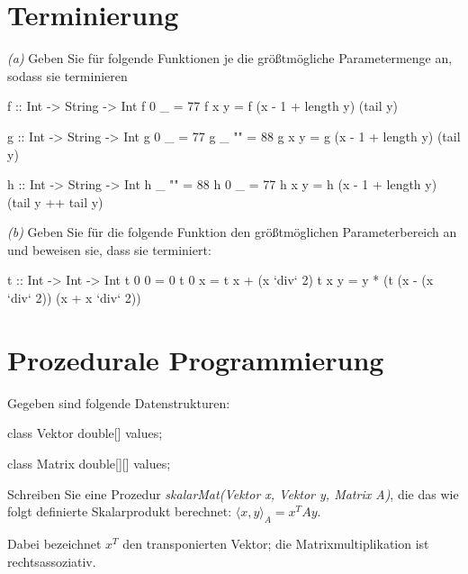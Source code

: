 \documentclass[11pt,a4paper,oneside,ngerman]{scrbook}
\begin{document}
\newpage



\section{Terminierung}

\emph{(a)} Geben Sie für folgende Funktionen je die größtmögliche Parametermenge an, sodass sie terminieren

\begin{code}
  f :: Int -> String -> Int
  f 0 _ = 77
  f x y = f (x - 1 + length y) (tail y)
\end{code}

\begin{code}
  g :: Int -> String -> Int
  g 0 _ = 77
  g _ "" = 88
  g x y = g (x - 1 + length y) (tail y)
\end{code}

\begin{code}
  h :: Int -> String -> Int
  h _ "" = 88
  h 0 _ = 77
  h x y = h (x - 1 + length y) (tail y ++ tail y)
\end{code}


\emph{(b)} Geben Sie für die folgende Funktion den größtmöglichen Parameterbereich an und beweisen sie, dass sie terminiert:

\begin{code}
t :: Int -> Int -> Int
t 0 0 = 0
t 0 x = t x + (x `div` 2)
t x y = y * (t (x - (x `div` 2)) (x + x `div` 2))
\end{code}

\newpage

\section{Prozedurale Programmierung}
Gegeben sind folgende Datenstrukturen:

\begin{code}
class Vektor {
  double[] values;
}

class Matrix {
  double[][] values;
}
\end{code}

Schreiben Sie eine Prozedur \emph{skalarMat(Vektor x, Vektor y, Matrix A)}, die das wie folgt definierte Skalarprodukt berechnet: $\langle x, y\rangle_A  =  x^TAy$.

Dabei bezeichnet $x^T$ den transponierten Vektor; die Matrixmultiplikation ist rechtsassoziativ.

\begin{code}
  double skalarMat(Vektor x, Vektor y, Matrix A) {
    
  
\end{code}
\end{document}
